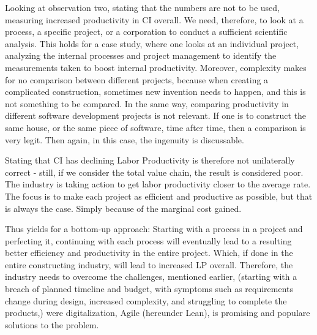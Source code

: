 Looking at observation two, stating that the numbers are not to be used, measuring increased productivity in CI overall. We need, therefore, to look at a process, a specific project, or a corporation to conduct a sufficient scientific analysis. This holds for a case study, where one looks at an individual project, analyzing the internal processes and project management to identify the measurements taken to boost internal productivity. Moreover, complexity makes for no comparison between different projects, because when creating a complicated construction, sometimes new invention needs to happen, and this is not something to be compared. In the same way, comparing productivity in different software development projects is not relevant. If one is to construct the same house, or the same piece of software, time after time, then a comparison is very legit. Then again, in this case, the ingenuity is discussable.

Stating that CI has declining Labor Productivity is therefore not unilaterally correct - still, if we consider the total value chain, the result is considered poor. The industry is taking action to get labor productivity closer to the average rate. The focus is to make each project as efficient and productive as possible, but that is always the case. Simply because of the marginal cost gained.

Thus yields for a bottom-up approach: Starting with a process in a project and perfecting it, continuing with each process will eventually lead to a resulting better efficiency and productivity in the entire project.  Which, if done in the entire constructing industry, will lead to increased LP overall. Therefore, the industry needs to overcome the challenges, mentioned earlier, (starting with a breach of planned timeline and budget, with symptoms such as requirements change during design, increased complexity, and struggling to complete the products,) were digitalization, Agile (hereunder Lean), is promising and populare solutions to the problem. 

